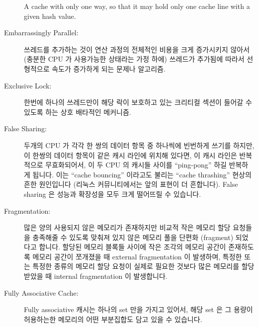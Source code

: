 \begin{description}
	A cache with only one way, so that it may hold only one cache
	line with a given hash value.
	\fi
\item[Embarrassingly Parallel:]
	쓰레드를 추가하는 것이 연산 과정의 전체적인 비용을 크게 증가시키지
	않아서 (충분한 CPU 가 사용가능한 상태라는 가정 하에) 쓰레드가 추가됨에
	따라서 선형적으로 속도가 증가하게 되는 문제나 알고리즘.
	\iffalse

	A problem or algorithm where adding threads does not significantly
	increase the overall cost of the computation, resulting in
	linear speedups as threads are added (assuming sufficient
	CPUs are available).
	\fi
\item[Exclusive Lock:]
	한번에 하나의 쓰레드만이 해당 락이 보호하고 있는 크리티컬 섹션이 들어갈
	수 있도록 하는 상호 배타적인 메커니즘.
	\iffalse

	An exclusive lock is a mutual-exclusion mechanism that
	permits only one thread at a time into the
	set of critical sections guarded by that lock.
	\fi
\item[False Sharing:]
	두개의 CPU 가 각각 한 쌍의 데이터 항목 중 하나씩에 빈번하게 쓰기를
	하지만, 이 한쌍의 데이터 항목이 같은 캐시 라인에 위치해 있다면, 이 캐시
	라인은 반복적으로 무효화되어서, 이 두 CPU 의 캐시들 사이를
	``ping-pong'' 하길 반복하게 됩니다.
	이는 ``cache bouncing'' 이라고도 불리는 ``cache thrashing'' 현상의 흔한
	원인입니다 (리눅스 커뮤니티에서는 앞의 표현이 더 흔합니다).
	False sharing 은 성능과 확장성을 모두 크게 떨어뜨릴 수 있습니다.
	\iffalse

	If two CPUs each frequently write to one of a pair of data items,
	but the pair of data items are located in the same cache line,
	this cache line will be repeatedly invalidated, ``ping-ponging''
	back and forth between the two CPUs' caches.
	This is a common cause of ``cache thrashing'', also called
	``cacheline bouncing'' (the latter most commonly in the Linux
	community).
	False sharing can dramatically reduce both performance and
	scalability.
	\fi
\item[Fragmentation:]
	많은 양의 사용되지 않은 메모리가 존재하지만 비교적 작은 메모리 할당
	요청들을 충족해줄 수 있도록 맞춰져 있지 않은 메모리 풀을 단편화
	(fragment) 되었다고 합니다.
	할당된 메모리 블록들 사이에 작은 조각의 메모리 공간이 존재하도록 메모리
	공간이 쪼개졌을 때 external fragmentation 이 발생하며, 특정한 또는
	특정한 종류의 메모리 할당 요청이 실제로 필요한 것보다 많은 메모리를
	할당받았을 때 internal fragmentation 이 발생합니다.
	\iffalse

	A memory pool that has a large amount of unused memory, but
	not laid out to permit satisfying a relatively small request
	is said to be fragmented.
	External fragmentation occurs when the space is divided up
	into small fragments lying between allocated blocks of memory,
	while internal fragmentation occurs when specific requests or
	types of requests have been allotted more memory than they
	actually requested.
	\fi
\item[Fully Associative Cache:]
	Fully associative 캐시는 하나의 set 만을 가지고 있어서, 해당 set 은 그
	용량이 허용하는한 메모리의 어떤 부분집합도 담고 있을 수 있습니다.
	\iffalse


\end{description}
